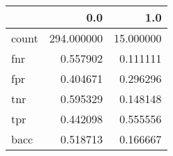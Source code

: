 \begin{tabular}{lrr}
\toprule
{} &         0.0 &        1.0 \\
\midrule
count &  294.000000 &  15.000000 \\
fnr   &    0.557902 &   0.111111 \\
fpr   &    0.404671 &   0.296296 \\
tnr   &    0.595329 &   0.148148 \\
tpr   &    0.442098 &   0.555556 \\
bacc  &    0.518713 &   0.166667 \\
\bottomrule
\end{tabular}
